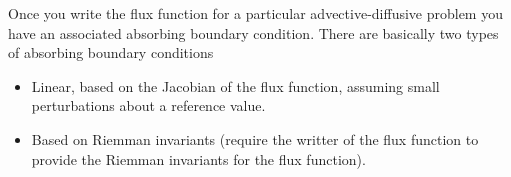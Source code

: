

Once you write the flux function for a particular advective-diffusive
problem you have an associated absorbing boundary condition. There are
basically two types of absorbing boundary conditions

\begin{itemize}
\compactlist 
\item Linear, based on the Jacobian of the flux function, assuming
  small perturbations about a reference value. 
\item Based on Riemman invariants (require the writter of the flux
  function to provide the Riemman invariants for the flux function).
\end{itemize}
 
